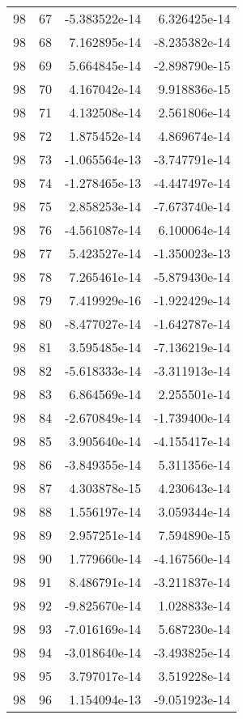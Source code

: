 \begin{tabular}{rrrr}
  98 &   67 & -5.383522e-14 &  6.326425e-14 \\
  98 &   68 &  7.162895e-14 & -8.235382e-14 \\
  98 &   69 &  5.664845e-14 & -2.898790e-15 \\
  98 &   70 &  4.167042e-14 &  9.918836e-15 \\
  98 &   71 &  4.132508e-14 &  2.561806e-14 \\
  98 &   72 &  1.875452e-14 &  4.869674e-14 \\
  98 &   73 & -1.065564e-13 & -3.747791e-14 \\
  98 &   74 & -1.278465e-13 & -4.447497e-14 \\
  98 &   75 &  2.858253e-14 & -7.673740e-14 \\
  98 &   76 & -4.561087e-14 &  6.100064e-14 \\
  98 &   77 &  5.423527e-14 & -1.350023e-13 \\
  98 &   78 &  7.265461e-14 & -5.879430e-14 \\
  98 &   79 &  7.419929e-16 & -1.922429e-14 \\
  98 &   80 & -8.477027e-14 & -1.642787e-14 \\
  98 &   81 &  3.595485e-14 & -7.136219e-14 \\
  98 &   82 & -5.618333e-14 & -3.311913e-14 \\
  98 &   83 &  6.864569e-14 &  2.255501e-14 \\
  98 &   84 & -2.670849e-14 & -1.739400e-14 \\
  98 &   85 &  3.905640e-14 & -4.155417e-14 \\
  98 &   86 & -3.849355e-14 &  5.311356e-14 \\
  98 &   87 &  4.303878e-15 &  4.230643e-14 \\
  98 &   88 &  1.556197e-14 &  3.059344e-14 \\
  98 &   89 &  2.957251e-14 &  7.594890e-15 \\
  98 &   90 &  1.779660e-14 & -4.167560e-14 \\
  98 &   91 &  8.486791e-14 & -3.211837e-14 \\
  98 &   92 & -9.825670e-14 &  1.028833e-14 \\
  98 &   93 & -7.016169e-14 &  5.687230e-14 \\
  98 &   94 & -3.018640e-14 & -3.493825e-14 \\
  98 &   95 &  3.797017e-14 &  3.519228e-14 \\
  98 &   96 &  1.154094e-13 & -9.051923e-14 \\

\end{tabular}
